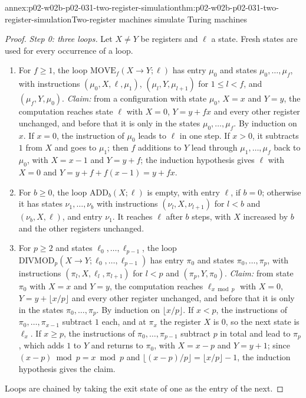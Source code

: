 \begin{annexitem}{annex:p02-w02b-p02-031-two-register-simulation}{thm:p02-w02b-p02-031-two-register-simulation}{Two-register machines simulate Turing machines}
\begin{proof}
\emph{Step 0: three loops.}  Let \(X\neq Y\) be registers and \(\ell\) a
state.  Fresh states are used for every occurrence of a loop.
\begin{enumerate}
\item[(M1)] For \(f\geq1\), the loop \(\mathrm{MOVE}_f(X\to Y;\ell)\) has
  entry \(\mu_0\) and states \(\mu_0,\ldots,\mu_f\), with instructions
  \((\mu_0,X,\ell,\mu_1)\), \((\mu_l,Y,\mu_{l+1})\) for \(1\leq l<f\), and
  \((\mu_f,Y,\mu_0)\).  \emph{Claim:} from a configuration with state
  \(\mu_0\), \(X=x\) and \(Y=y\), the computation reaches state \(\ell\) with
  \(X=0\), \(Y=y+fx\) and every other register unchanged, and before that it
  is only in the states \(\mu_0,\ldots,\mu_f\).  By induction on \(x\).  If
  \(x=0\), the instruction of \(\mu_0\) leads to \(\ell\) in one step.  If
  \(x>0\), it subtracts \(1\) from \(X\) and goes to \(\mu_1\); then \(f\)
  additions to \(Y\) lead through \(\mu_1,\ldots,\mu_f\) back to \(\mu_0\),
  with \(X=x-1\) and \(Y=y+f\); the induction hypothesis gives \(\ell\) with
  \(X=0\) and \(Y=y+f+f(x-1)=y+fx\).
\item[(M2)] For \(b\geq0\), the loop \(\mathrm{ADD}_b(X;\ell)\) is empty, with
  entry \(\ell\), if \(b=0\); otherwise it has states \(\nu_1,\ldots,\nu_b\)
  with instructions \((\nu_l,X,\nu_{l+1})\) for \(l<b\) and
  \((\nu_b,X,\ell)\), and entry \(\nu_1\).  It reaches \(\ell\) after \(b\)
  steps, with \(X\) increased by \(b\) and the other registers unchanged.
\item[(M3)] For \(p\geq2\) and states \(\ell_0,\ldots,\ell_{p-1}\), the loop
  \(\mathrm{DIVMOD}_p(X\to Y;\allowbreak\ell_0,\ldots,\ell_{p-1})\) has entry \(\pi_0\)
  and states \(\pi_0,\ldots,\pi_p\), with instructions
  \((\pi_l,X,\ell_l,\pi_{l+1})\) for \(l<p\) and \((\pi_p,Y,\pi_0)\).
  \emph{Claim:} from state \(\pi_0\) with \(X=x\) and \(Y=y\), the computation
  reaches \(\ell_{x\bmod p}\) with \(X=0\), \(Y=y+\lfloor x/p\rfloor\) and
  every other register unchanged, and before that it is only in the states
  \(\pi_0,\ldots,\pi_p\).  By induction on \(\lfloor x/p\rfloor\).  If
  \(x<p\), the instructions of \(\pi_0,\ldots,\pi_{x-1}\) subtract \(1\)
  each, and at \(\pi_x\) the register \(X\) is \(0\), so the next state is
  \(\ell_x\).  If \(x\geq p\), the instructions of \(\pi_0,\ldots,\pi_{p-1}\)
  subtract \(p\) in total and lead to \(\pi_p\), which adds \(1\) to \(Y\) and
  returns to \(\pi_0\), with \(X=x-p\) and \(Y=y+1\); since \((x-p)\bmod
  p=x\bmod p\) and \(\lfloor(x-p)/p\rfloor=\lfloor x/p\rfloor-1\), the
  induction hypothesis gives the claim.
\end{enumerate}
Loops are chained by taking the exit state of one as the entry of the next.


\end{proof}
\end{annexitem}
